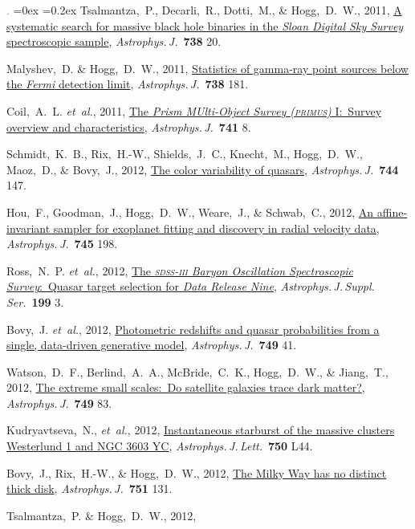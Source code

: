 \documentclass[12pt,letterpaper]{article}
\newcommand{\latin}[1]{\textsl{#1}}
\newcommand{\etal}{\latin{et~al.}}
\newcommand{\project}[1]{\textsl{#1}}
\newcommand{\doi}[2]{\href{http://dx.doi.org/#1}{{#2}}}
\newcommand{\deemph}[1]{\textcolor{grey}{\footnotesize{#1}}}
\newcommand{\pubnumber}[1]{\deemph{{#1}.}}
\newcounter{refpubnum}
\newcommand{\hogglist}{%
    \rightmargin=0in
    \leftmargin=0.18in
    \topsep=0ex
    \partopsep=0pt
    \itemsep=0.2ex
    \parsep=0pt
    \itemindent=-1.0\leftmargin
    \listparindent=0.0\leftmargin
    \settowidth{\labelsep}{~}
    \usecounter{refpubnum}
  }
\begin{document}
\begin{list}{\pubnumber{\therefpubnum}}{\hogglist}
Tsalmantza,~P., Decarli,~R., Dotti,~M., \& Hogg,~D.~W., 2011,
\doi{10.1088/0004-637X/738/1/20}{A systematic search for massive black hole binaries in the \project{Sloan Digital Sky Survey} spectroscopic sample},
\textit{Astrophys.\,J.}\ \textbf{738} 20.
\item
Malyshev,~D. \& Hogg,~D.~W., 2011,
\doi{10.1088/0004-637X/738/2/181}{Statistics of gamma-ray point sources below the \project{Fermi} detection limit},
\textit{Astrophys.\,J.}\ \textbf{738} 181.
\item
Coil,~A.~L. \etal, 2011,
\doi{10.1088/0004-637X/741/1/8}{The \project{Prism MUlti-Object Survey (\textsc{primus})} I:\ Survey overview and characteristics},
\textit{Astrophys.\,J.}\ \textbf{741} 8.
\item
Schmidt,~K.~B., Rix,~H.-W., Shields,~J.~C., Knecht,~M., Hogg,~D.~W., Maoz,~D., \& Bovy,~J., 2012,
\doi{10.1088/0004-637X/744/2/147}{The color variability of quasars}, 
\textit{Astrophys.\,J.}\ \textbf{744} 147.
\item
Hou,~F., Goodman,~J., Hogg,~D.~W., Weare,~J., \& Schwab,~C., 2012,
\doi{10.1088/0004-637X/745/2/198}{An affine-invariant sampler for exoplanet fitting and discovery in radial velocity data},
\textit{Astrophys.\,J.}\ \textbf{745} 198.
\item
Ross,~N.~P. \etal, 2012,
\doi{10.1088/0067-0049/199/1/3}{The \project{\textsc{sdss-iii} Baryon Oscillation Spectroscopic Survey}:\ Quasar target selection for \project{Data Release Nine}},
\textit{Astrophys.\,J.\,Suppl.\,Ser.}\ \textbf{199} 3.
\item
Bovy,~J. \etal, 2012,
\doi{10.1088/0004-637X/749/1/41}{Photometric redshifts and quasar probabilities from a single, data-driven generative model},
\textit{Astrophys.\,J.}\ \textbf{749} 41.
\item
Watson,~D.~F., Berlind,~A.~A., McBride,~C.~K., Hogg,~D.~W., \& Jiang,~T., 2012,
\doi{10.1088/0004-637X/749/1/83}{The extreme small scales:\ Do satellite galaxies trace dark matter?},
\textit{Astrophys.\,J.}\ \textbf{749} 83.
\item
Kudryavtseva,~N., \etal, 2012,
\doi{10.1088/2041-8205/750/2/L44}{Instantaneous starburst of the massive clusters Westerlund 1 and NGC 3603 YC},
\textit{Astrophys.\,J.\,Lett.}\ \textbf{750} L44.
\item
Bovy,~J., Rix,~H.-W., \& Hogg,~D.~W., 2012,
\doi{10.1088/0004-637X/751/2/131}{The Milky Way has no distinct thick disk},
\textit{Astrophys.\,J.}\ \textbf{751} 131.
\item
Tsalmantza,~P. \& Hogg,~D.~W., 2012,

\end{list}
\end{document}
